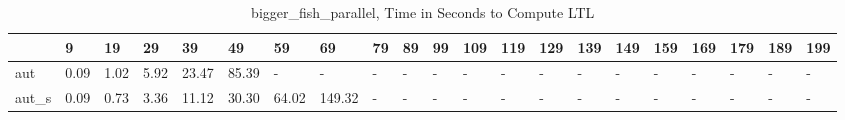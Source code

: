 \begin{table}
\caption{bigger_fish_parallel, Time in Seconds to Compute LTL}
\label{bigger_fish_parallel_LTL_time}
\begin{tabular}{lllllllllllllllllllll}
\toprule
 & 9 & 19 & 29 & 39 & 49 & 59 & 69 & 79 & 89 & 99 & 109 & 119 & 129 & 139 & 149 & 159 & 169 & 179 & 189 & 199 \\
\midrule
aut & 0.09 & 1.02 & 5.92 & 23.47 & 85.39 & - & - & - & - & - & - & - & - & - & - & - & - & - & - & - \\
aut_s & 0.09 & 0.73 & 3.36 & 11.12 & 30.30 & 64.02 & 149.32 & - & - & - & - & - & - & - & - & - & - & - & - & - \\
\bottomrule
\end{tabular}
\end{table}
